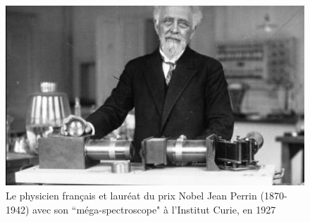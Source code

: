 \begin{figure}[h]
	\begin{center}
		\includegraphics[width=16cm]{02_body/introduction/image/perrin.jpg}
		\caption{Le physicien français et lauréat du prix Nobel Jean Perrin (1870-1942) avec son ``méga-spectroscope" à l'Institut Curie, en 1927}
	\end{center}
\end{figure}